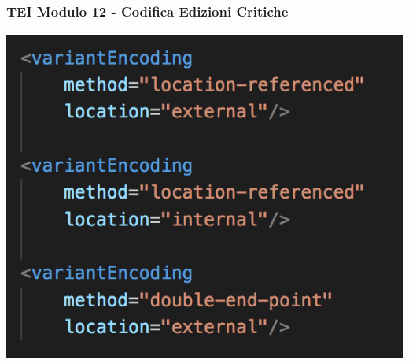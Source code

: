 \begin{frame}
    \frametitle{TEI Modulo 12 - Codifica Edizioni Critiche}
    \framesubtitle{}
    \addtocounter{nframe}{1}
    

    \begin{center}
       \includegraphics[width=.95\textwidth]{imgs/variantEncoding.png}
    \end{center}

\end{frame}









